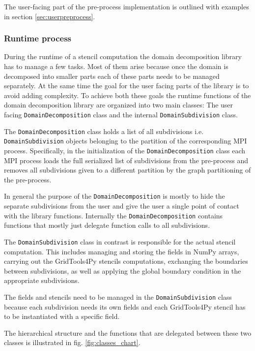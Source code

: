 The user-facing part of the pre-process implementation is outlined with examples in section \ref{sec:userpreprocess}.

\subsubsection{Runtime process}
During the runtime of a stencil computation the domain decomposition library has to manage a few tasks.
Most of them arise because once the domain is decomposed into smaller parts each of these parts needs to be managed separately.
At the same time the goal for the user facing parts of the library is to avoid adding complexity.
To achieve both these goals the runtime functions of the domain decomposition library are organized into two main classes:
The user facing \texttt{DomainDecomposition} class and the internal \texttt{DomainSubdivision} class.

The \texttt{DomainDecomposition} class holds a list of all subdivisions i.e. \texttt{DomainSubdivision} objects belonging to the partition of the corresponding MPI process.
Specifically, in the initialization of the \texttt{DomainDecomposition} class each MPI process loads the full serialized list of subdivisions from the pre-process and removes all subdivisions given to a different partition by the graph partitioning of the pre-process.

In general the purpose of the \texttt{DomainDecomposition} is mostly to hide the separate subdivisions from the user and give the user a single point of contact with the library functions.
Internally the \texttt{DomainDecomposition} contains functions that mostly just delegate function calls to all subdivisions.

The \texttt{DomainSubdivision} class in contrast is responsible for the actual stencil computation.
This includes managing and storing the fields in NumPy arrays, carrying out the GridTools4Py stencils computations, exchanging the boundaries between subdivisions, as well as applying the global boundary condition in the appropriate subdivisions.

The fields and stencils need to be managed in the \texttt{DomainSubdivision} class because each subdivision needs its own fields and each GridTools4Py stencil has to be instantiated with a specific field.

The hierarchical structure and the functions that are delegated between these two classes is illustrated in fig. \ref{fig:classes_chart}.

